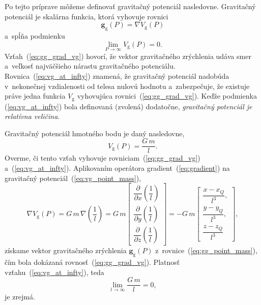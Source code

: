 \documentclass[a4paper, 12pt]{book}
\newcommand{\gidx}{\mathrm g}
\let\vec\mathbf
\begin{document}
Po tejto príprave môžeme definovať gravitačný potenciál nasledovne.  Gravitačný
potenciál je skalárna funkcia, ktorá vyhovuje rovnici
\citep{SansoGeoidDetermination}
%
\begin{equation}
\label{eq:gg_grad_vg}
\vec g_\gidx(P) = \nabla V_\gidx(P)
\end{equation}
%
a~spĺňa podmienku
%
\begin{equation}
\label{eq:vg_at_infty}
\lim_{P \to \infty} V_\gidx(P) = 0{.}
\end{equation}
%
Vzťah~(\ref{eq:gg_grad_vg}) hovorí, že vektor gravitačného zrýchlenia udáva
smer a~veľkosť najväčšieho nárastu gravitačného potenciálu.
Rovnica~(\ref{eq:vg_at_infty}) znamená, že gravitačný potenciál nadobúda
v~nekonečnej vzdialenosti od telesa nulovú hodnotu a~zabezpečuje, že existuje
práve jedna funkcia $V_\gidx$ vyhovujúca rovnici~(\ref{eq:gg_grad_vg}).  Keďže
podmienka (\ref{eq:vg_at_infty}) bola definovaná (zvolená) dodatočne,
\emph{gravitačný potenciál je relatívna veličina}.

Gravitačný potenciál hmotného bodu je daný nasledovne,
%
\begin{equation}
\label{eq:vg_point_mass}
V_\gidx(P) = \frac{G \, m}{l}{.}
\end{equation}
%
Overme, či tento vzťah vyhovuje rovniciam~(\ref{eq:gg_grad_vg})
a~(\ref{eq:vg_at_infty}).  Aplikovaním operátora gradient~(\ref{eq:gradient})
na gravitačný potenciál~(\ref{eq:vg_point_mass}),
%
\begin{equation}
\label{eq:gg_from_vg_point_mass}
\nabla V_\gidx(P) = G \, m \, \nabla \left( \frac{1}{l} \right) =
%
G \, m
\begin{bmatrix}
\dfrac{\partial}{\partial x} \left( \dfrac{1}{l} \right)\\[2ex]
\dfrac{\partial}{\partial y} \left( \dfrac{1}{l} \right)\\[2ex]
\dfrac{\partial}{\partial z} \left( \dfrac{1}{l} \right)
\end{bmatrix}
%
=
%
-G \, m
%
\begin{bmatrix}
\dfrac{x - x_Q}{l^3}{,}\\[2ex]
\dfrac{y - y_Q}{l^3}{,}\\[2ex]
\dfrac{z - z_Q}{l^3}
\end{bmatrix}
{,}
\end{equation}
%
získame vektor gravitačného zrýchlenia $\vec g_\gidx(P)$
z~rovnice~(\ref{eq:gg_point_mass}), čím bola dokázaná
rovnosť~(\ref{eq:gg_grad_vg}).  Platnosť vzťahu~(\ref{eq:vg_at_infty}), teda
%
\begin{equation}
\lim_{l \to \infty} \frac{G \, m}{l} = 0{,}
\end{equation}
%
je zrejmá.
\end{document}
